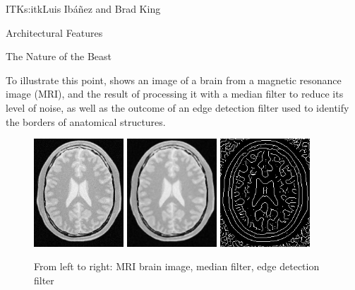 \begin{aosachapter}{ITK}{s:itk}{Luis Ib\'{a}\~{n}ez and Brad King}
\begin{aosasect1}{Architectural Features}
\begin{aosasect2}{The Nature of the Beast}

To illustrate this point,  shows an image of a
brain from a magnetic resonance image (MRI), and the result of processing it
with a median filter to reduce its level of noise, as well as the outcome of an
edge detection filter used to identify the borders of anatomical structures.


%
%
\begin{figure}[h!]
\centering
\includegraphics[width=0.3\textwidth]{../images/itk/BrainProtonDensitySlice.png}
\includegraphics[width=0.3\textwidth]{../images/itk/BrainProtonDensitySliceMedian.png}
\includegraphics[width=0.3\textwidth]{../images/itk/BrainProtonDensitySliceCanny.png}
\caption{From left to right: MRI brain image, median filter, edge detection filter}
\label{fig.itk.brim}
\end{figure}


\end{aosasect2}
\end{aosasect1}
\end{aosachapter}
